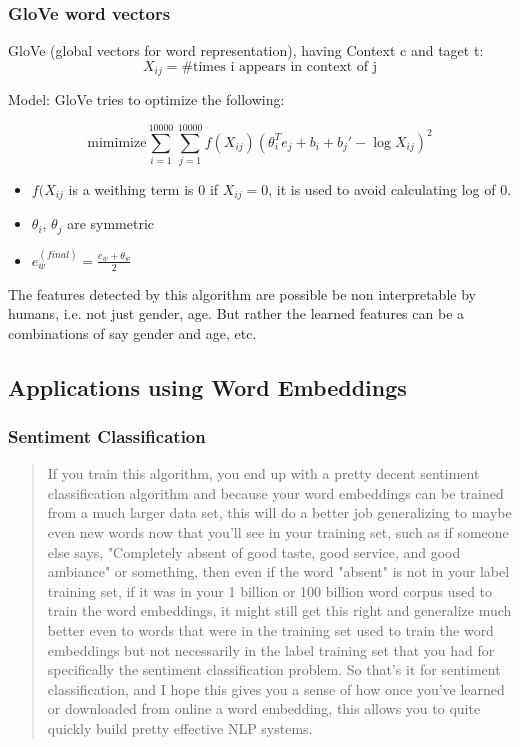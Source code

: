 \subsubsection{GloVe word vectors}

GloVe (global vectors for word representation), having Context c and taget t:
\begin{equation*}
    X_{ij} = \text{\# times i appears in context of j}
\end{equation*}

Model: GloVe tries to optimize the following:

\begin{equation*}
\text{mimimize} \sum^{10000}_{i=1} \sum^{10000}_{j=1} f(X_{ij}) (\theta^{T}_{i} e_{j} + b_i + b_j' - \log X_{ij})^2
\end{equation*}

\begin{itemize}
    \item $f(X_{ij}$ is a weithing term is 0 if $X_{ij} = 0$, it is used to avoid calculating log of 0.
    \item $\theta_i$, $\theta_j$ are symmetric
    \item $e^{(final)}_w = \frac{e_w + \theta_w}{2}$
\end{itemize}
The features detected by this algorithm are possible be non interpretable by humans, i.e. not just gender, age. But rather the learned features can be a combinations of say gender and age, etc.

\subsection{Applications using Word Embeddings}
\subsubsection{Sentiment Classification}
\begin{quote}
If you train this algorithm, you end up with a pretty decent sentiment classification algorithm and because your word embeddings can be trained from a much larger data set, this will do a better job generalizing to maybe even new words now that you'll see in your training set, such as if someone else says, "Completely absent of good taste, good service, and good ambiance" or something, then even if the word "absent" is not in your label training set, if it was in your 1 billion or 100 billion word corpus used to train the word embeddings, it might still get this right and generalize much better even to words that were in the training set used to train the word embeddings but not necessarily in the label training set that you had for specifically the sentiment classification problem. So that's it for sentiment classification, and I hope this gives you a sense of how once you've learned or downloaded from online a word embedding, this allows you to quite quickly build pretty effective NLP systems. 
\end{quote}
 

